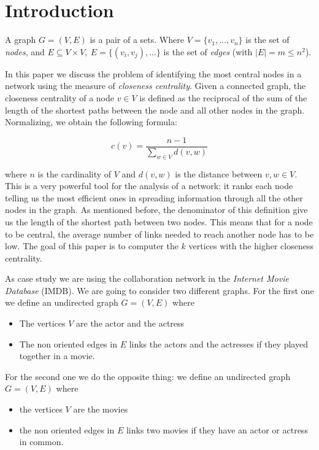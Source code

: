 \section{Introduction}
A graph $G= (V,E)$ is a pair of a sets. Where $V = \{v_1,...,v_n\}$ is the set of \emph{nodes}, and $E \subseteq V \times V, ~ E = \{(v_i,v_j),...\}$  is the set of \emph{edges} (with $|E| = m \leq n^2$). \s

\nd In this paper we discuss the problem of identifying the most central nodes in a network using the measure of \emph{closeness centrality}. Given a connected graph, the closeness centrality of a node $v \in V$ is defined as the reciprocal of the sum of the length of the shortest paths between the node and all other nodes in the graph. Normalizing, we obtain the following formula:

\begin{equation}\label{closeness}
   c(v) = \frac{n-1}{\displaystyle \sum_{w \in V} d(v,w)}
\end{equation}

\nd where $n$ is the cardinality of $V$ and $d(v,w)$ is the distance between $v,w \in V$. This is a very powerful tool for the analysis of a network: it ranks each node telling us the most efficient ones in spreading information through all the other nodes in the graph. As mentioned before, the denominator of this definition give us the length of the shortest path between two nodes. This means that for a node to be central, the average number of links needed to reach another node has to be low. The goal of this paper is to computer the $k$ vertices with the higher closeness centrality. \s

\noindent As case study we are using the collaboration network in the \emph{Internet Movie Database} (IMDB).  We are going to consider two different graphs. For the first one we define an undirected graph $G=(V,E)$ where
\begin{itemize}
    \item The vertices $V$ are the actor and the actress
    \item The non oriented edges in $E$ links the actors and the actresses if they played together in a movie.
\end{itemize}
For the second one we do the opposite thing: we define an undirected graph $G=(V,E)$ where
\begin{itemize}
    \item the vertices $V$ are the movies
    \item the non oriented edges in $E$ links two movies if they have an actor or actress in common.
\end{itemize}


